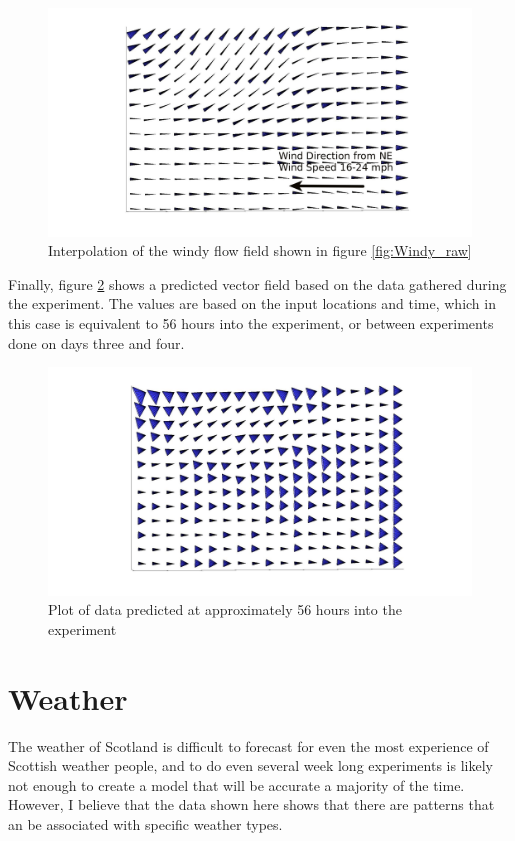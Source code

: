 \documentclass[12pt]{report}
\begin{document}
\begin{figure}[!ht]
	\centering
	\includegraphics[scale=0.2]{windy_interp_moded.jpg}
	\caption{Interpolation of the windy flow field shown in figure \ref{fig:Windy_raw}}
	\label{fig:Windy_interp}
\end{figure}

Finally, figure \ref{fig:windy_inter_reg_mid} shows a predicted vector field based on the data gathered during the experiment. The values are based on the input locations and time, which in this case is equivalent to 56 hours into the experiment, or between experiments done on days three and four.

\begin{figure}[!ht]
	\centering
	\includegraphics[scale = 0.2]{windy_inter_reg_mid.jpg}
	\caption{Plot of data predicted at approximately 56 hours into the experiment}
	\label{fig:windy_inter_reg_mid}
\end{figure}

\clearpage
\section{Weather}
The weather of Scotland is difficult to forecast for even the most experience of Scottish weather people, and to do even several week long experiments is likely not enough to create a model that will be accurate a majority of the time. However, I believe that the data shown here shows that there are patterns that an be associated with specific weather types.
\end{document}

